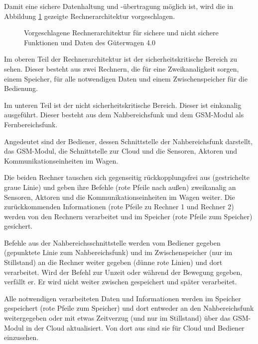 Damit eine sichere Datenhaltung und -übertragung möglich ist, wird die in Abbildung \ref{fig:Rechnerarchitektur} gezeigte Rechnerarchitektur vorgeschlagen.\par
\begin{figure}[ht]
    \centering
    
    \caption{Vorgeschlagene Rechnerarchitektur für sichere und nicht sichere Funktionen und Daten des Güterwagen 4.0}
    \label{fig:Rechnerarchitektur}
\end{figure}
Im oberen Teil der Rechnerarchitektur ist der sicherheitskritische Bereich zu sehen. %
Dieser besteht aus zwei Rechnern, die für eine Zweikanaligkeit sorgen, einem Speicher,  für alle notwendigen Daten und einem Zwischenspeicher für die Bedienung.\par
Im unteren Teil ist der nicht sicherheitskritische Bereich. Dieser ist einkanalig ausgeführt. Dieser besteht aus dem Nahbereichsfunk und dem GSM-Modul als Fernbereichsfunk.\par
Angedeutet sind der Bediener, dessen Schnittstelle der Nahbereichsfunk darstellt, das GSM-Modul, die Schnittstelle zur Cloud und die Sensoren, Aktoren und Kommunikationseinheiten im Wagen.\par
Die beiden Rechner tauschen sich gegenseitig rückkopplungsfrei aus (gestrichelte graue Linie) und geben ihre Befehle (rote Pfeile nach außen) zweikanalig an Sensoren, Aktoren und die Kommunikationseinheiten im Wagen weiter. Die zurückkommenden Informationen (rote Pfeile zu Rechner 1 und Rechner 2) werden von den Rechnern verarbeitet und im Speicher (rote Pfeile zum Speicher) gesichert.\par
Befehle aus der Nahbereichsschnittstelle werden vom Bediener gegeben (gepunktete Linie zum Nahbereichsfunk) und im Zwischenspeicher (nur im Stillstand) an die Rechner weiter gegeben (dünne rote Linien) und dort verarbeitet. Wird der Befehl zur Unzeit oder während der Bewegung gegeben, verfällt er. Er wird nicht weiter zwischen gespeichert und später verarbeitet.\par
Alle notwendigen verarbeiteten Daten und Informationen werden im Speicher gespeichert (rote Pfeile zum Speicher) und dort entweder an den Nahbereichsfunk weitergegeben oder mit etwas Zeitverzug (und nur im Stillstand) über das GSM-Modul in der Cloud aktualisiert. Von dort aus sind sie für Cloud und Bediener einzusehen.\par










